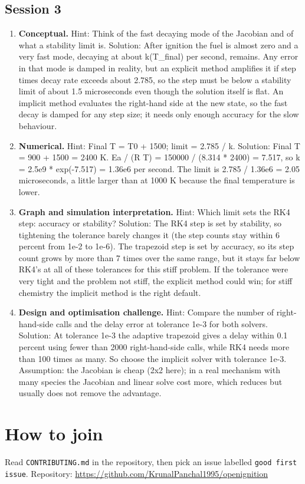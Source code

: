 \documentclass[11pt,a4paper]{article}
\begin{document}
\subsection*{Session 3}
\begin{enumerate}[nosep]
\item \textbf{Conceptual.} Hint: Think of the fast decaying mode of the Jacobian and of what a stability limit is. Solution: After ignition the fuel is almost zero and a very fast mode, decaying at about k(T\_final) per second, remains. Any error in that mode is damped in reality, but an explicit method amplifies it if step times decay rate exceeds about 2.785, so the step must be below a stability limit of about 1.5 microseconds even though the solution itself is flat. An implicit method evaluates the right-hand side at the new state, so the fast decay is damped for any step size; it needs only enough accuracy for the slow behaviour.
\item \textbf{Numerical.} Hint: Final T = T0 + 1500; limit = 2.785 / k. Solution: Final T = 900 + 1500 = 2400 K. Ea / (R T) = 150000 / (8.314 * 2400) = 7.517, so k = 2.5e9 * exp(-7.517) = 1.36e6 per second. The limit is 2.785 / 1.36e6 = 2.05 microseconds, a little larger than at 1000 K because the final temperature is lower.
\item \textbf{Graph and simulation interpretation.} Hint: Which limit sets the RK4 step: accuracy or stability? Solution: The RK4 step is set by stability, so tightening the tolerance barely changes it (the step counts stay within 6 percent from 1e-2 to 1e-6). The trapezoid step is set by accuracy, so its step count grows by more than 7 times over the same range, but it stays far below RK4's at all of these tolerances for this stiff problem. If the tolerance were very tight and the problem not stiff, the explicit method could win; for stiff chemistry the implicit method is the right default.
\item \textbf{Design and optimisation challenge.} Hint: Compare the number of right-hand-side calls and the delay error at tolerance 1e-3 for both solvers. Solution: At tolerance 1e-3 the adaptive trapezoid gives a delay within 0.1 percent using fewer than 2000 right-hand-side calls, while RK4 needs more than 100 times as many. So choose the implicit solver with tolerance 1e-3. Assumption: the Jacobian is cheap (2x2 here); in a real mechanism with many species the Jacobian and linear solve cost more, which reduces but usually does not remove the advantage.
\end{enumerate}

\section{How to join}
Read \texttt{CONTRIBUTING.md} in the repository, then pick an issue labelled \texttt{good first issue}. Repository: \url{https://github.com/KrunalPanchal1995/openignition}
\end{document}
